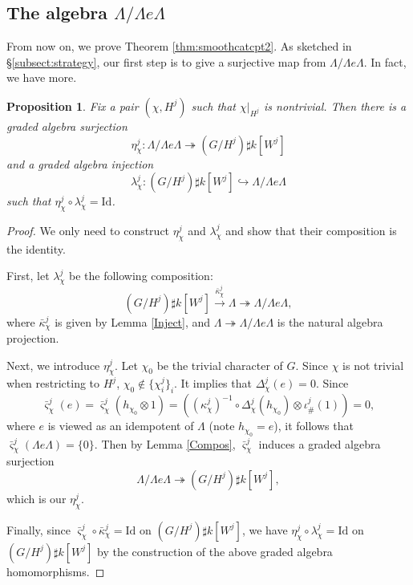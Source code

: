 \documentclass[11pt,reqno]{amsart}
\newtheorem{proposition}[theorem]{Proposition}
\theoremstyle{definition}
\begin{document}
\subsection{The algebra $\Lambda/ \Lambda e\Lambda$}

From now on, we prove
Theorem \ref{thm:smoothcatcpt2}.
As sketched in \S\ref{subsect:strategy},
our first step is to give
a surjective map from
$\Lambda/\Lambda e\Lambda$.
In fact, we have more.


\begin{proposition}\label{Modstru}
Fix a pair $(\chi, H^j)$ such that 
$\chi|_{H^j}$ is nontrivial. Then there is a graded algebra surjection 	
$$
\eta^{j}_{\chi}: \Lambda / \Lambda e \Lambda \twoheadrightarrow (G / H^j) \sharp k[W^{j}]
$$		
and a graded algebra injection 
$$
\lambda^{j}_{\chi}: (G / H^j) \sharp k[W^{j}] \hookrightarrow \Lambda / \Lambda e \Lambda
$$	
such that $\eta^{j}_{\chi} \circ \lambda^{j}_{\chi}  = \mathrm{Id}$. 
\end{proposition}


\begin{proof}
We only need to construct
$\eta^{j}_{\chi}$ and 
$\lambda^{j}_{\chi}$ and show
that their composition is
the identity.

First, let 
$\lambda^{j}_{\chi}$ be the following composition: 	
$$
(G / H^j) \sharp k[W^{j}] \xrightarrow{\bar\kappa^{j}_{\chi}} 
\Lambda \twoheadrightarrow \Lambda / \Lambda e \Lambda, 
$$
where 
$\bar\kappa^{j}_{\chi}$
is given by Lemma \ref{Inject},
and
$\Lambda \twoheadrightarrow \Lambda / \Lambda e \Lambda$ is the natural algebra projection. 

Next, we introduce $\eta_\chi^j$.
Let $\chi_0$ be the trivial character of $G$. Since $\chi$ is not trivial when restricting 
to $H^j$, $\chi_0 \notin \{ \chi_i^j \}_i$. 
It implies that $\Delta^{j}_{\chi}(e) = 0$.
Since
$$
\bar\varsigma^{j}_{\chi}(e) = \bar\varsigma^{j}_{\chi}(h_{\chi_0} \otimes 1) 
= ( (\kappa^{j}_{\chi})^{-1} \circ \Delta^{j}_{\chi}(h_{\chi_0})  \otimes \iota^j_{\#}(1) ) = 0,  
$$
where $e$ is viewed as an idempotent of 
$\Lambda$ (note $h_{\chi_0} = e$), 
it follows that $\bar\varsigma^{j}_{\chi}(\Lambda e \Lambda) = \{ 0\}$. 
Then
by Lemma 
\ref{Compos},
$\bar\varsigma^{j}_{\chi}$ induces a graded algebra surjection 
$$
\Lambda / \Lambda e \Lambda \twoheadrightarrow (G / H^j) \sharp k[W^{j}],
$$
which is our
$\eta^{j}_{\chi}$. 

Finally, 
since $\bar\varsigma^{j}_{\chi} \circ \bar\kappa^{j}_{\chi}
= \mathrm{Id} $
on $(G / H^j) \sharp k[W^{j}]$, we
have $\eta^{j}_{\chi} \circ 
\lambda^{j}_{\chi}  = \mathrm{Id}$ 
on $(G / H^j) \sharp k[W^{j}]$ by the
construction of the above graded algebra
homomorphisms. 
\end{proof}
\end{document}
